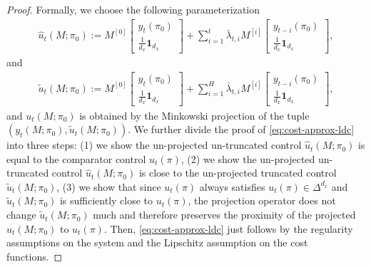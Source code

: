 \begin{proof}
Formally, we choose the following parameterization
\begin{align*}
\hat{u}_t(M;\pi_0):=M^{[0]}\begin{bmatrix}
    y_t(\pi_0) \\
    \frac{1}{d_x}\mathbf{1}_{d_x}
\end{bmatrix} +\sum_{i=1}^t\bar{\lambda}_{t,i}M^{[i]}\begin{bmatrix}
    y_{t-i}(\pi_0) \\
    \frac{1}{d_x}\mathbf{1}_{d_x}
\end{bmatrix} ,
\end{align*}
and
\begin{align}
\label{eq:truncated-unprojected-control}
\tilde{u}_t(M;\pi_0):=M^{[0]}\begin{bmatrix}
    y_t(\pi_0) \\
    \frac{1}{d_x}\mathbf{1}_{d_x}
\end{bmatrix} +\sum_{i=1}^H\bar{\lambda}_{t,i}M^{[i]}\begin{bmatrix}
    y_{t-i}(\pi_0) \\
    \frac{1}{d_x}\mathbf{1}_{d_x}
\end{bmatrix} ,
\end{align}
and $u_t(M;\pi_0)$ is obtained by the Minkowski projection of the tuple $(y_t(M;\pi_0), \tilde{u}_t(M;\pi_0))$. We further divide the proof of \cref{eq:cost-approx-ldc} into three steps: (1) we show the un-projected un-truncated control $\hat{u}_t(M;\pi_0)$ is equal to the comparator control $u_t(\pi)$, (2) we show the un-projected un-truncated control $\hat{u}_t(M;\pi_0)$ is close to the un-projected truncated control $\tilde{u}_t(M;\pi_0)$, (3) we show that since $u_t(\pi)$ always satisfies $u_t(\pi)\in\Delta^{d_x}$ and $\tilde{u}_t(M;\pi_0)$ is sufficiently close to $u_t(\pi)$, the projection operator does not change $\tilde{u}_t(M;\pi_0)$ much and therefore preserves the proximity of the projected $u_t(M;\pi_0)$ to $u_t(\pi)$. Then, \cref{eq:cost-approx-ldc} just follows by the regularity assumptions on the system and the Lipschitz assumption on the cost functions. 


\end{proof}

